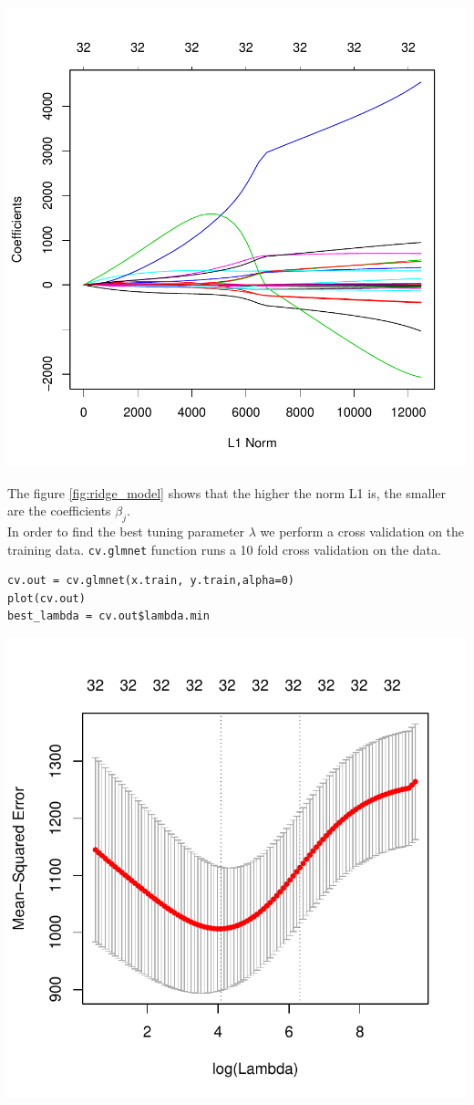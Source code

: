 \documentclass[]{report}
\begin{document}
\begin{center}
	\includegraphics[width=0.8\linewidth]{Figures/ridge_model.pdf}
	\label{fig:ridge_model}
\end{center}

The figure \ref{fig:ridge_model} shows that the higher the norm L1 is, the smaller are the coefficients $\beta_{j}$.\\

In order to find the best tuning parameter $\lambda$ we perform a cross validation on the training data. \texttt{cv.glmnet} function runs a 10 fold cross validation on the data.

\begin{lstlisting}
cv.out = cv.glmnet(x.train, y.train,alpha=0)
plot(cv.out)
best_lambda = cv.out$lambda.min
\end{lstlisting}

\begin{center}
	\includegraphics[width=0.8\linewidth]{Figures/cv_glmnet.pdf}
	\label{fig:cv_glmnet}
\end{center}
\end{document}
